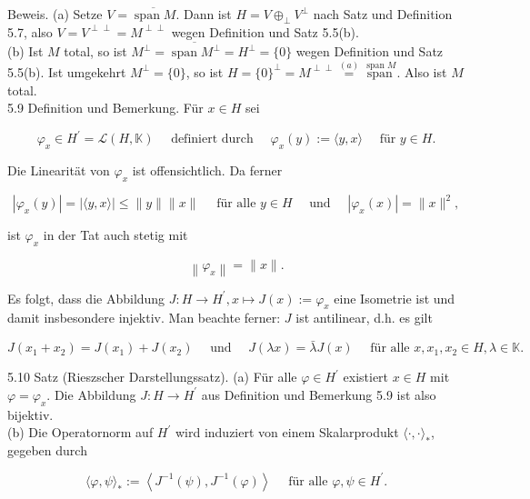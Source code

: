 \documentclass[10pt, letterpaper]{article}
\begin{document}
Beweis. (a) Setze $V=\overline{\operatorname{span} M}$. Dann ist $H=V \oplus_{\perp} V^{\perp}$ nach Satz und Definition 5.7, also $V=V^{\perp \perp}=M^{\perp \perp}$ wegen Definition und Satz 5.5(b).\\
(b) Ist $M$ total, so ist $M^{\perp}=\overline{\operatorname{span} M^{\perp}}=H^{\perp}=\{0\}$ wegen Definition und Satz 5.5(b). Ist umgekehrt $M^{\perp}=\{0\}$, so ist $H=\{0\}^{\perp}=M^{\perp \perp} \stackrel{(a)}{=} \stackrel{\text { span } M}{\text { span }}$. Also ist $M$ total.\\
5.9 Definition und Bemerkung. Für $x \in H$ sei

$$
\varphi_{x} \in H^{\prime}=\mathcal{L}(H, \mathbb{K}) \quad \text { definiert durch } \quad \varphi_{x}(y):=\langle y, x\rangle \quad \text { für } y \in H .
$$

Die Linearität von $\varphi_{x}$ ist offensichtlich. Da ferner

$$
\left|\varphi_{x}(y)\right|=|\langle y, x\rangle| \leq\|y\|\|x\| \quad \text { für alle } y \in H \quad \text { und } \quad\left|\varphi_{x}(x)\right|=\|x\|^{2},
$$

ist $\varphi_{x}$ in der Tat auch stetig mit

$$
\left\|\varphi_{x}\right\|=\|x\| .
$$

Es folgt, dass die Abbildung $J: H \rightarrow H^{\prime}, x \mapsto J(x):=\varphi_{x}$ eine Isometrie ist und damit insbesondere injektiv. Man beachte ferner: $J$ ist antilinear, d.h. es gilt

$$
J\left(x_{1}+x_{2}\right)=J\left(x_{1}\right)+J\left(x_{2}\right) \quad \text { und } \quad J(\lambda x)=\bar{\lambda} J(x) \quad \text { für alle } x, x_{1}, x_{2} \in H, \lambda \in \mathbb{K} .
$$

5.10 Satz (Rieszscher Darstellungssatz). (a) Für alle $\varphi \in H^{\prime}$ existiert $x \in H$ mit $\varphi=\varphi_{x}$. Die Abbildung $J: H \rightarrow H^{\prime}$ aus Definition und Bemerkung 5.9 ist also bijektiv.\\
(b) Die Operatornorm auf $H^{\prime}$ wird induziert von einem Skalarprodukt $\langle\cdot, \cdot\rangle_{*}$, gegeben durch

$$
\langle\varphi, \psi\rangle_{*}:=\left\langle J^{-1}(\psi), J^{-1}(\varphi)\right\rangle \quad \text { für alle } \varphi, \psi \in H^{\prime} .
$$
\end{document}
